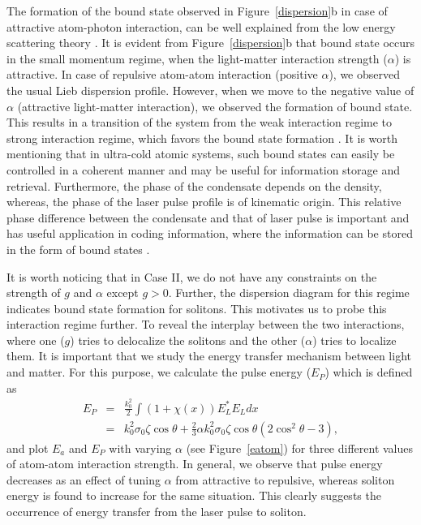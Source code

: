 \documentclass[epj]{svjour}
\begin{document}
The formation of the bound state observed in Figure~\ref{dispersion}b in case of attractive atom-photon interaction, can be well explained from the low energy scattering theory \cite{sakurai1995modern}. It is evident from Figure~\ref{dispersion}b that bound state occurs in the small momentum regime, when the light-matter interaction strength ($\alpha$) is attractive. In case of repulsive atom-atom interaction (positive $\alpha$), we observed the usual Lieb dispersion profile. However, when we move to the negative value of $\alpha$ (attractive light-matter interaction), we observed the formation of bound state. This results in a transition of the system from the weak interaction regime to strong interaction regime, which favors the bound state formation \cite{chen2014pseudogap}. It is worth mentioning that in ultra-cold atomic systems, such bound states can easily be controlled in a coherent manner and may be useful for information storage and retrieval. Furthermore, the phase of the condensate depends on the density, whereas, the phase of the laser pulse profile is of kinematic origin. This relative phase difference between the condensate and that of laser pulse is important and has useful application in coding information, where the information can be stored in the form of bound states \cite{agarwal2003slow}.


It is worth noticing that in Case II, we do not have any constraints on the strength of $g$ and $\alpha$ except $g>0$. Further, the dispersion diagram for this regime indicates bound state formation for solitons. This motivates us to probe this interaction regime further. To reveal the interplay between the two interactions, where one ($g$) tries to delocalize the solitons and the other ($\alpha$) tries to localize them. It is important that we study the energy transfer mechanism between light and matter. For this purpose, we calculate the pulse energy ($E_P$) which is defined as 
\begin{eqnarray}
  E_P &=& \frac{k_0^2}{2}\int(1+\chi(x)) E_L^*E_L dx\nonumber\\
  &=&k_0^2\sigma_0\zeta\cos\theta + \frac{2}{3}\alpha k_0^2\sigma_0\zeta\cos\theta\left(2\cos^2\theta-3\right),
\end{eqnarray}
and plot
$E_a$  and $E_P$ with varying $\alpha$ (see Figure~\ref{eatom}) for three different values of atom-atom interaction strength. In general, we observe that pulse energy decreases as an effect of tuning $\alpha$ from attractive to repulsive, whereas soliton energy is found to increase for the same situation. This clearly suggests the occurrence of
energy transfer from the laser pulse to soliton.
\end{document}

